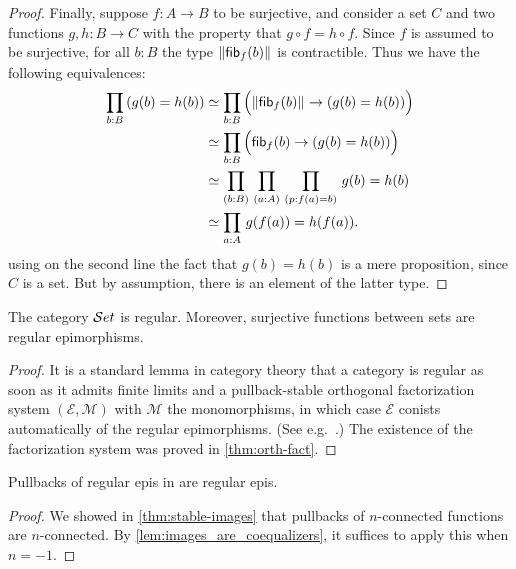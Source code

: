 \begin{proof}
Finally, suppose $f:A\to B$ to be surjective, and consider a set $C$ and two functions
$g,h:B\to C$ with the property that $g\circ f = h\circ f$. Since $f$ 
is assumed to be surjective, for all $b:B$ the type $\mathopen{}\left\Vert {\mathsf{fib}}_{f}(b)\right\Vert_{}\mathclose{}$ is contractible.
Thus we have the following equivalences:
\begin{align*}
\prd{b:B} (g(b)= h(b))
& \eqvsym \prd{b:B} \Parens{\brck{\hfib f b} \to (g(b)= h(b))}\\
& \eqvsym \prd{b:B} \Parens{\hfib f b \to (g(b)= h(b))}\\
& \eqvsym \prd{b:B}{a:A}{p:f(a)= b} g(b)= h(b)\\
& \eqvsym \prd{a:A} g(f(a))= h(f(a)).
\end{align*}
using on the second line the fact that $g(b)=h(b)$ is a mere proposition, since $C$ is a set.
But by assumption, there is an element of the latter type.
\end{proof}


\begin{thm}\label{thm:set_regular}\label{lem:images_are_coequalizers}
The category $\mathcal{S}et$ is regular. Moreover, surjective functions between sets are regular epimorphisms.
\end{thm}

\begin{proof}
It is a standard lemma in category theory that a category is regular as soon as it admits finite limits and a pullback-stable orthogonal 
factorization system $(\mathcal{E},\mathcal{M})$ with $\mathcal{M}$ the monomorphisms, in which case $\mathcal{E}$ conists automatically of 
the regular epimorphisms.
(See e.g.~\cite[A1.3.4]{elephant}.)
The existence of the factorization system was proved in \autoref{thm:orth-fact}.
\end{proof}

\begin{lem}\label{lem:pb_of_coeq_is_coeq}
Pullbacks of regular epis in \uset are regular epis.
\end{lem}
\begin{proof}
  We showed in \autoref{thm:stable-images} that pullbacks of $n$-connected functions are $n$-connected.
  By \autoref{lem:images_are_coequalizers}, it suffices to apply this when $n=-1$.
\end{proof}

